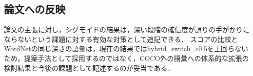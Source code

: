 \subsection{論文への反映}
論文の主張に対し，シグモイドの結果は，深い段階の確信度が誤りの手がかりにならないという課題に対する有効な対策として追記できる．
スコアの比較とWordNetの同じ深さの語彙は，現在の結果ではhybrid\_switch\_c0.5を上回らないため，提案手法として採用するのではなく，COCO外の語彙への体系的な拡張の検討結果と今後の課題として記述するのが妥当である．
